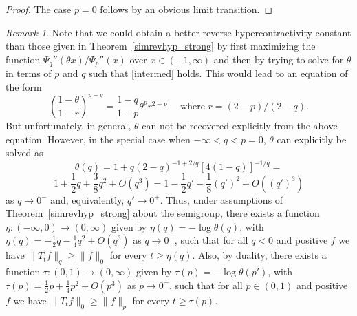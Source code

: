 \documentclass[11pt]{amsart}
\newcommand{\1}{\mathbf{1}}
\theoremstyle{definition}
\theoremstyle{plain}
\theoremstyle{remark}
\newtheorem{remark}[example]{Remark}
\numberwithin{equation}{section}
\begin{document}
\begin{proof}
The case $p=0$ follows by an obvious limit transition.
\end{proof}

\begin{remark} \label{rem:zero_case}
Note that we could obtain a better reverse hypercontractivity constant than those given in Theorem~\ref{simrevhyp_strong} by first maximizing  the function
$\Psi_{q}''(\theta x)/ \Psi_{p}''(x)$
over $x \in (-1, \infty)$ and then by trying to solve for $\theta$ in terms of $p$ and $q$ such that
\eqref{intermed}
holds. This would lead to an equation of the form
\begin{equation*} \label{gamma_relation}
\left( \frac{1- \theta }{1-r} \right)^{p-q} = \frac{1-q}{1-p} \theta^p r^{2-p} \quad \text{ where } r = (2-p)/(2-q).
\end{equation*}
But unfortunately, in general,  $\theta$ can not be recovered explicitly from the above equation.
 However, in the special case when $-\infty < q < p=0$, $\theta$ can explicitly be solved as 
\[ \theta(q) =  1 + q (2-q)^{-1+2/q} [4(1-q)]^{-1/q}=\]
\[
1+\frac{1}{2}q+\frac{3}{8}q^{2}+O(q^{3})=1-\frac{1}{2}q'-\frac{1}{8}(q')^{2}+O((q')^{3})
\]
as $q \rightarrow 0^{-}$ and, equivalently, $q' \rightarrow 0^{+}$.
Thus, under assumptions of Theorem~\ref{simrevhyp_strong} about the semigroup,
there exists a function $\eta: (-\infty,0) \longrightarrow (0,\infty)$ given by $\eta(q)=-\log \theta(q)$, with $\eta(q)=
-\frac{1}{2}q-\frac{1}{4}q^{2}+O(q^{3})$ as $q \rightarrow 0^{-}$, such that for all $q<0$ and positive $f$ we have
$
\| T_{t}f\|_{q} \geq \| f\|_{0}
$
for every $t \geq \eta(q)$.
Also, by duality, there exists a function $\tau: (0,1) \longrightarrow (0,\infty)$ given by $\tau(p)=-\log \theta(p')$,
with $\tau(p)=\frac{1}{2}p+\frac{1}{4}p^{2}+O(p^{3})$ as $p \rightarrow 0^{+}$, such that for all
$p \in (0,1)$ and positive $f$ we have
$
\| T_{t}f\|_{0} \geq \| f\|_{p} 
$
for every $t \geq \tau(p)$.
\end{remark}
\end{document}

